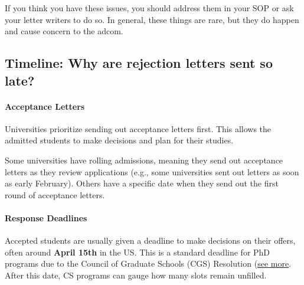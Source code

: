 \documentclass[oneside,11pt,dvipsnames]{book}
\def\sectioninfo#1{%
  \addcontentsline{toc}{sectioninfo}{%
    \noexpand\numberline{}\color{black}{#1}}%
}
\begin{document}
If you think you have these issues, you should address them in your SOP or ask your letter writers to do so.
In general, these things are rare, but they do happen and cause concern to the adcom.




\subsection{Timeline: Why are rejection letters sent so late?}\label{sec:late-rejection}
\sectioninfo{Why rejection letters are sent so late? Grad programs often wait for the accepted students to make their decisions, typically by April 15, before sending out rejection letters.}


\paragraph{Acceptance Letters} Universities prioritize sending out acceptance letters first. This allows the admitted students to make decisions and plan for their studies.

Some universities have rolling admissions, meaning they send out acceptance letters as they review applications (e.g., some universities sent out letters as soon as early February). Others have a specific date when they send out the first round of acceptance letters.   

\paragraph{Response Deadlines} Accepted students are usually given a deadline to make decisions on their offers, often around \textbf{April 15th} in the US. This is a standard deadline for PhD programs due to the Council of Graduate Schools (CGS) Resolution (\href{https://cgsnet.org/wp-content/uploads/2024/01/CGS_April15_Resolution_Jan312024.pdf}{see more}. After this date, CS programs can gauge how many slots remain unfilled.
\end{document}
